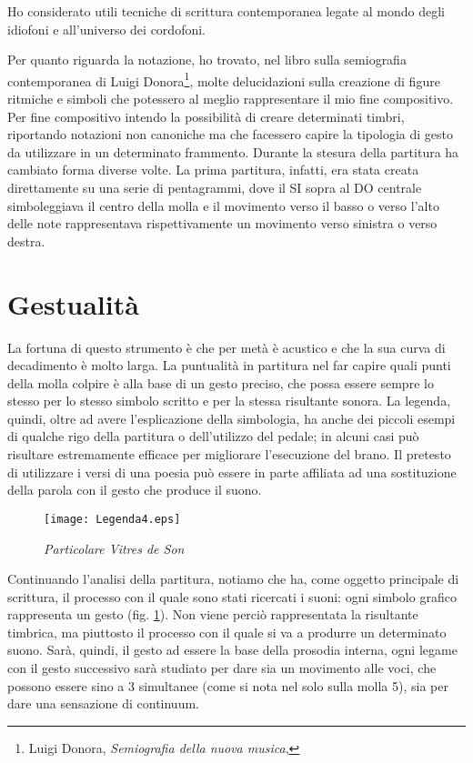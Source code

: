 Ho considerato utili tecniche di scrittura contemporanea legate al mondo degli idiofoni e all'universo dei cordofoni.

Per quanto riguarda la notazione, ho trovato, nel libro sulla semiografia contemporanea di Luigi Donora\footnote{Luigi Donora, \textit{Semiografia della nuova musica}, }, molte delucidazioni sulla creazione di figure ritmiche e simboli che potessero al meglio rappresentare il mio fine compositivo. Per fine compositivo intendo la possibilità di creare determinati timbri, riportando notazioni non canoniche ma che facessero capire la tipologia di gesto da utilizzare in un determinato frammento. Durante la stesura della partitura ha cambiato forma diverse volte. La prima partitura, infatti, era stata creata direttamente su una serie di pentagrammi, dove il SI sopra al DO centrale  simboleggiava il centro della molla e il movimento verso il basso o verso l'alto delle note rappresentava rispettivamente un movimento verso sinistra o verso destra.


\section{Gestualità}

La fortuna di questo strumento è che per metà è acustico e che la sua curva di decadimento è molto larga. La puntualità in partitura nel far capire quali punti della molla colpire è alla base di un gesto preciso, che possa essere sempre lo stesso per lo stesso simbolo scritto e per la stessa risultante sonora. La legenda, quindi, oltre ad avere l'esplicazione della simbologia, ha anche dei piccoli esempi di qualche rigo della partitura o dell'utilizzo del pedale; in alcuni casi può risultare estremamente efficace per migliorare l'esecuzione del brano. Il pretesto di utilizzare i versi di una poesia può essere in parte affiliata ad una sostituzione della parola con il gesto che produce il suono. 
\\
\begin{figure}[htbp]
\begin{center}
\texttt{[image: Legenda4.eps]}
\caption{\textit{Particolare \textit{Vitres de Son}}}
\label{fig:vitres}
\end{center}
\end{figure}
Continuando l'analisi della partitura, notiamo che ha, come oggetto principale di scrittura, il processo con il quale sono stati ricercati i suoni: ogni simbolo grafico rappresenta un gesto (fig. \ref{fig:vitres}). Non viene perciò rappresentata la risultante timbrica, ma piuttosto il processo con il quale si va a produrre un determinato suono. Sarà, quindi, il gesto ad essere la base della prosodia interna, ogni legame con il gesto successivo sarà studiato per dare sia un movimento alle voci, che possono essere sino a 3 simultanee (come si nota nel solo sulla molla 5), sia per dare una sensazione di continuum.

